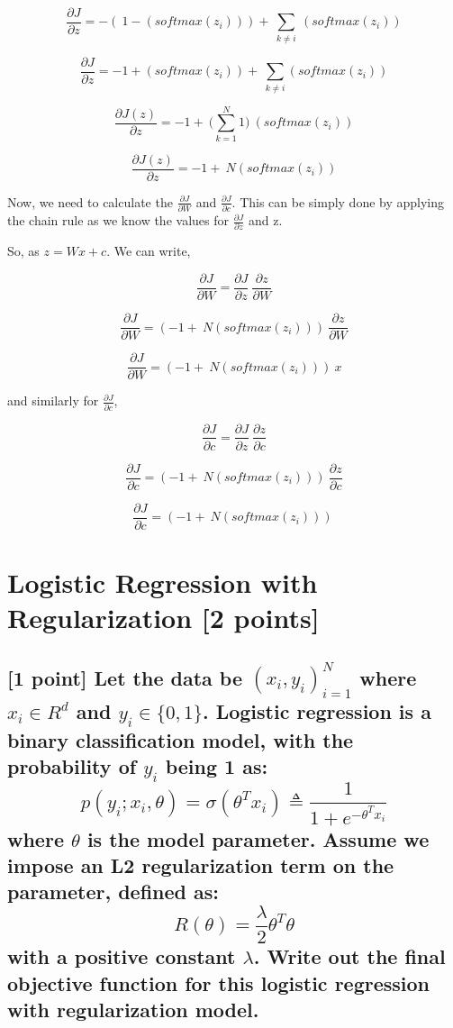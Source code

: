 $$\frac{\partial J}{\partial z} = -(\ 1-(softmax(z_i))) + \ \sum_{k\neq i}\ (softmax(z_i))$$

$$\frac{\partial J}{\partial z} = -1 + (softmax(z_i)) + \ \sum_{k\neq i}(softmax(z_i))$$


$$\frac{\partial J(z)}{\partial z} = -1 + \ \Big(\sum_{k=1}^{N}1\Big) \ (softmax(z_i))$$


$$\frac{\partial J(z)}{\partial z} = -1 + \ N (softmax(z_i))$$ 

Now, we need to calculate the $ \frac{\partial J}{\partial W} $ and $ \frac{\partial J}{\partial c} $. This can be simply done by applying the chain rule as we know the values for $\frac{\partial J}{\partial z} $ and z. 

So, as  $z = W x + c$. 
We can write,  

$$\frac{\partial J}{\partial W}  = \frac{\partial J}{\partial z} \ \frac{\partial z}{\partial W}$$

$$\frac{\partial J}{\partial W}  = (-1 + \ N (softmax(z_i))) \ \frac{\partial z}{\partial W}$$

$$\frac{\partial J}{\partial W}  = (-1 + \ N (softmax(z_i))) \ x $$

and similarly for $ \frac{\partial J}{\partial c} $,


$$ \frac{\partial J}{\partial c}  = \frac{\partial J}{\partial z} \ \frac{\partial z}{\partial c}$$

$$\frac{\partial J}{\partial c}  = (-1 + \ N (softmax(z_i))) \ \frac{\partial z}{\partial c}$$

$$\frac{\partial J}{\partial c}  = (-1 + \ N (softmax(z_i))) \ $$


\section{Logistic Regression with Regularization [2 points]}
\subsection{ [1 point] Let the data be $(x_i, y_i)_{i=1}^{N} $ where $ x_i \in R^{d} $ and $ y_i \in \{0,1\} $. Logistic regression is a binary classification model, with the probability of $y_i$ being 1 as:
$$ p(y_i;x_i,\theta) =  \sigma(\theta^Tx_i) \triangleq \dfrac{1}{1 + e^{-\theta^Tx_{i}}} $$
where $\theta$ is the model parameter. Assume we impose an L2 regularization term on the
parameter, defined as:
$$ R(\theta) = \dfrac{\lambda}{2}\theta^T\theta$$
with a positive constant $ \lambda$. Write out the final objective function for this logistic
regression with regularization model.
}

